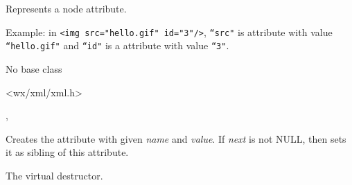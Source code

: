 
\section{}\label{wxxmlattribute}

Represents a node attribute.

Example: in {\tt <img src="hello.gif" id="3"/>}, {\tt ``src"} is attribute with value
{\tt ``hello.gif"} and {\tt ``id"} is a attribute with value {\tt ``3"}.


No base class


<wx/xml/xml.h>




, 



\label{wxxmlattributewxxmlattribute}




Creates the attribute with given {\it name} and {\it value}.
If {\it next} is not NULL, then sets it as sibling of this attribute.

\label{wxxmlattributedtor}


The virtual destructor.

\label{wxxmlattributegetname}


